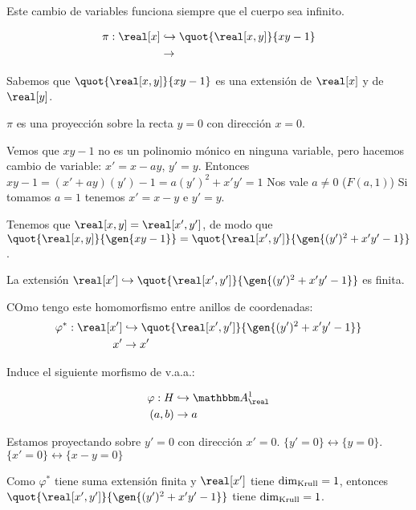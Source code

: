 Este cambio de variables funciona siempre que el cuerpo sea infinito.

\begin{example}

	\begin{align*}
	\pi: \real[x] & \hookrightarrow 	\quot{\real[x,y]}{xy-1}\\
		& \rightarrow
	\end{align*}

	Sabemos que $\quot{\real[x,y]}{xy-1}$ es una extensión de $\real[x]$ y de $\real[y]$.

	$\pi$ es una proyección sobre la recta $y=0$ con dirección $x=0$.

	Vemos que $xy-1$ no es un polinomio mónico en ninguna variable, pero hacemos cambio de variable:
	$x'=x-ay$, $y'=y$. Entonces $xy-1=(x'+ay)(y')-1=a(y')^2+x'y'=1$ Nos vale $a \neq 0$ ($F(a,1)$) Si tomamos $a=1$ tenemos $x'=x-y$ e $y'=y$.

	Tenemos que $\real[x,y]=\real[x',y']$, de modo que $\quot{\real[x,y]}{\gen{xy-1}}=\quot{\real[x',y']}{\gen{(y')^2+x'y'-1}}$.

	La extensión $\real[x'] \hookrightarrow \quot{\real[x',y']}{\gen{(y')^2+x'y'-1}}$ es finita.

	COmo tengo este homomorfismo entre anillos de coordenadas:
	\begin{align*}
		\varphi^*: \real[x'] & \hookrightarrow 	\quot{\real[x',y']}{\gen{(y')^2+x'y'-1}}\\
		x'	& \rightarrow x'
	\end{align*}

	Induce el siguiente morfismo de v.a.a.:

	\begin{align*}
		\varphi: H & \hookrightarrow 	\A^1_{\real}\\
		(a,b) & \rightarrow a
	\end{align*}

	Estamos proyectando sobre $y'=0$ con dirección $x'=0$. $\{y'=0\} \leftrightarrow \{ y=0 \}$. $\{x'=0\} \leftrightarrow \{ x-y=0 \}$

	Como $\varphi^*$ tiene suma extensión finita y $\real[x']$ tiene $\dim_{\mathrm{Krull}}=1$, entonces $\quot{\real[x',y']}{\gen{(y')^2+x'y'-1}}$ tiene $\dim_{\mathrm{Krull}}=1$.
\end{example}

